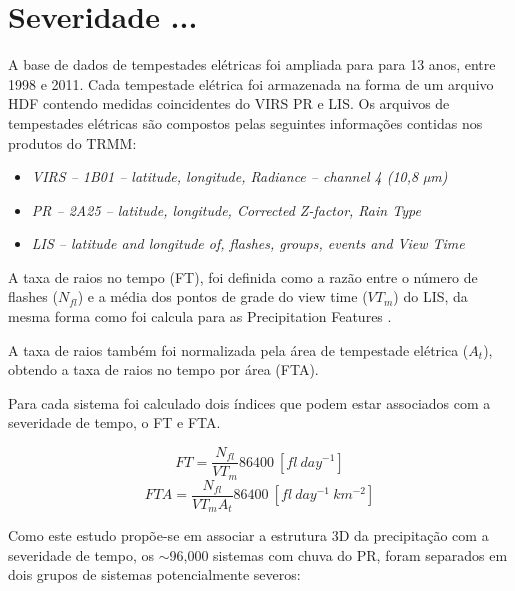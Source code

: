 \chapter{Severidade ...}



A base de dados de tempestades elétricas foi ampliada para para 13 anos, entre 1998 e 2011. Cada tempestade elétrica foi armazenada na forma de um arquivo HDF contendo medidas coincidentes do VIRS PR e LIS. Os arquivos de tempestades elétricas são compostos pelas seguintes informações contidas nos produtos do TRMM:

\begin{itemize}
\item \textit{VIRS -- 1B01 -- latitude, longitude, Radiance -- channel 4 (10,8 µm)}
\item \textit{PR -- 2A25 -- latitude, longitude, Corrected Z-factor, Rain Type }
\item \textit{LIS -- latitude and longitude of, flashes, groups, events and View Time  }
\end{itemize} 


A taxa de raios no tempo (FT), foi definida como a razão entre o número de flashes ($N_{fl}$) e a média dos pontos de grade do view time ($VT_m$) do LIS, da mesma forma como foi calcula para as Precipitation Features \cite{cecil2005, Nesbitt2000}. 

A taxa de raios também foi normalizada pela área de tempestade elétrica ($A_t$), obtendo a taxa de raios no tempo por área (FTA). 

Para cada sistema foi calculado dois índices que podem estar associados com a severidade de tempo, o FT e FTA.

\begin{equation}
FT = \frac{N_{fl} }{VT_m} 86400 ~[fl~day^{-1}]    
\end{equation}
\begin{equation}
FTA = \frac{N_{fl} }{VT_m A_t } 86400 ~[fl~day^{-1}~km^{-2}]
\end{equation}

Como este estudo propõe-se em associar a estrutura 3D da precipitação com a severidade de tempo, os $\sim$96,000 sistemas com chuva do PR, foram separados em dois grupos de sistemas potencialmente severos:

